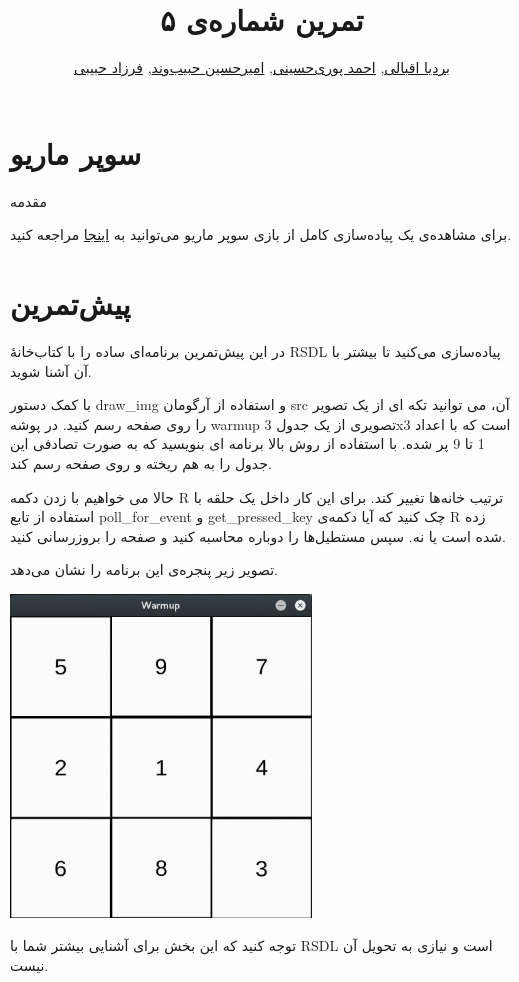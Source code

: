 \documentclass{utap}
\title{تمرین شماره‌ی ۵}
\author{
	\href{mailto:bardia.eghbali@gmail.com??subject=[AP\%20S98\%20A5]\%20}{بردیا اقبالی},
	\href{mailto:seyedahmadpourihosseini@gmail.com?subject=[AP\%20S98\%20A5]\%20}{احمد پوری‌حسینی},
	\href{mailto:ahhabibvand@gmail.com?subject=[AP\%20S98\%20A5]\%20}{امیرحسین حبیب‌وند},
	\href{mailto:farzadhabibii98@gmail.com?subject=[AP\%20S98\%20A5]\%20}{فرزاد حبیبی}
}
\begin{document}
	\maketitle

	\section*{ سوپر ماریو }
مقدمه

برای مشاهده‌ی یک پیاده‌سازی کامل از بازی سوپر ماریو می‌توانید به \href{https://supermariobros.io/}{اینجا} 	مراجعه کنید.
	\pagebreak

	\section{پیش‌تمرین}

در این پیش‌تمرین برنامه‌ای ساده را با کتاب‌خانۀ RSDL پیاده‌سازی می‌کنید تا بیشتر با آن آشنا شوید.


با کمک دستور draw\_img و استفاده از آرگومان src آن، می توانید تکه ای از یک تصویر را روی صفحه رسم کنید. در پوشه warmup تصویری از یک جدول 3x3 است که با اعداد 1 تا 9 پر شده. با استفاده از روش بالا برنامه ای بنویسید که به صورت تصادفی این جدول را به هم ریخته و روی صفحه رسم کند.

حالا می خواهیم با زدن دکمه R ترتیب خانه‌ها تغییر کند. برای این کار داخل یک حلقه با استفاده از تابع poll\_for\_event و get\_pressed\_key چک کنید که آیا دکمه‌ی R زده شده است یا نه. سپس مستطیل‌ها را دوباره محاسبه کنید و صفحه را بروزرسانی کنید.

تصویر زیر پنجره‌ی این برنامه را نشان می‌دهد.
	\begin{center}
		\includegraphics[width=8cm]{warmup.png}
	\end{center}
توجه کنید که این بخش برای آشنایی بیشتر شما با RSDL است و نیازی به تحویل آن نیست.
	\pagebreak
\end{document}
